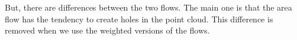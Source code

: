 But, there are differences between the two flows. The main one is that the area
flow has the tendency to create holes in the point cloud. This difference is
removed when we use the weighted versions of the flows.





